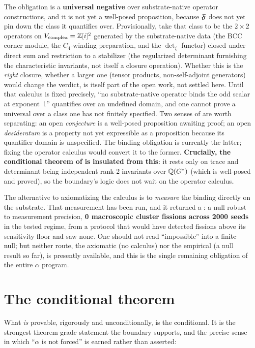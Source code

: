  The obligation is a
\textbf{universal negative} over substrate-native operator constructions, and it
is not yet a well-posed proposition, because $\mathfrak{F}$ does not yet pin down the
class it quantifies over. Provisionally, take that class to be the $2\times2$
operators on $V_{\mathrm{complex}}=\mathbb{Z}[i]^2$ generated by the substrate-native
data (the BCC corner module, the $C_4$-winding preparation, and the
$\det_\zeta$ functor) closed under direct sum and restriction to a stabilizer
(the regularized determinant furnishing the characteristic invariants, not itself
a closure operation). Whether this is the \emph{right} closure, whether a
larger one (tensor products, non-self-adjoint generators) would change the
verdict, is itself part of the open work, not settled here. Until that calculus is fixed precisely, ``no
substrate-native operator binds the odd scalar at exponent~1'' quantifies over an
undefined domain, and one cannot prove a universal over a class one has not
finitely specified. Two senses of  are worth separating: an open
\emph{conjecture} is a well-posed proposition awaiting proof; an open
\emph{desideratum} is a property not yet expressible as a proposition because its
quantifier-domain is unspecified. The binding obligation is currently the latter;
fixing the operator calculus would convert it to the former. \textbf{Crucially,
the conditional theorem of  is insulated from this}: it
rests only on trace and determinant being independent rank-2 invariants over
$\mathbb{Q}(G^{*})$ (which is well-posed and proved), so the boundary's logic does
not wait on the operator calculus.

 The alternative to
axiomatizing the calculus is to \emph{measure} the binding directly on the
substrate. That measurement has been run, and it returned a : a null
robust to measurement precision, \textbf{0 macroscopic cluster fissions
across 2000 seeds} in the tested regime, from a protocol that would have detected
fissions above its sensitivity floor and saw none. One should not read
``impossible'' into a finite null; but neither route, the axiomatic (no
calculus) nor the empirical (a null result so far), is presently available, and
this is the single remaining obligation of the entire $\alpha$ program.

\section{The conditional theorem}\label{sec:conditional}
What \emph{is} provable, rigorously and unconditionally, is the conditional. It is
the strongest theorem-grade statement the boundary supports, and the precise sense
in which ``$\alpha$ is not forced'' is earned rather than asserted:

